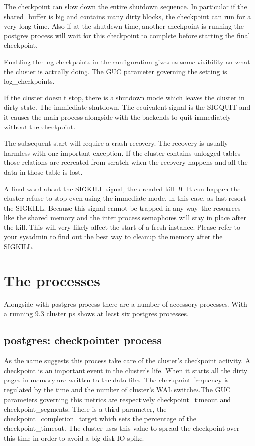 The checkpoint can slow down the entire shutdown sequence. In particular if the shared\_buffer is
big and contains many dirty blocks, the checkpoint can run for a very long time. Also if at
the shutdown time, another checkpoint is running the postgres process will wait for this
checkpoint to complete before starting the final checkpoint.\newline

Enabling the log checkpoints in the configuration gives us some visibility on what the cluster is
actually doing. The GUC parameter governing the setting is log\_checkpoints.\newline


If the cluster doesn't stop, there is a shutdown mode which leaves the cluster in dirty state.
The immiediate shutdown. The equivalent signal is the SIGQUIT and it causes the main process
alongside with the backends to quit immediately without the checkpoint.\newline

The subsequent start will require a crash recovery. The recovery is usually harmless with one
important exception. If the cluster contains unlogged tables those relations are recreated from
scratch when the recovery happens and all the data in those table is lost.

A final word about the SIGKILL signal, the dreaded kill -9. It can happen the cluster refuse to
stop even using the immediate mode. In this case, as last resort the SIGKILL. Because this signal
cannot be trapped in any way, the resources like the shared memory and the inter process semaphores
will stay in place after the kill. This will very likely affect the start of a fresh instance.
Please refer to your sysadmin to find out the best way to cleanup the memory after the
SIGKILL.

\section{The processes}
\label{sec:PROCESSES}
Alongside with postgres process there are a number of accessory processes. With a running 9.3
cluster ps shows at least six postgres processes. 

\subsection{postgres: checkpointer process}
As the name suggests this process take care of the cluster's checkpoint activity.
A checkpoint is an important event in the cluster's life. When it starts all the dirty pages in
memory are written to the data files. The checkpoint frequency is regulated by the time and the
number of cluster's WAL switches.The GUC parameters governing this metrics are respectively
checkpoint\_timeout and checkpoint\_segments.
There is a third parameter, the checkpoint\_completion\_target
which sets the percentage of the checkpoint\_timeout. The cluster uses this value to spread the
checkpoint over this time in order to avoid a big disk IO spike.

